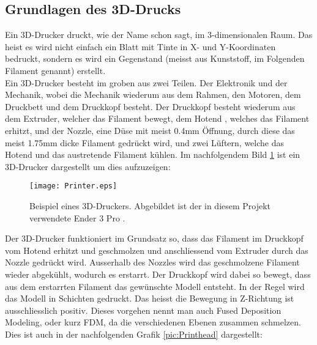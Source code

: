 \subsection{Grundlagen des 3D-Drucks}
\label{sec:Grundlagen3DDruck}

Ein 3D-Drucker druckt, wie der Name schon sagt, im 3-dimensionalen Raum. Das heist es wird nicht einfach ein Blatt mit Tinte in X- und Y-Koordinaten bedruckt, sondern es wird ein Gegenstand (meisst aus Kunststoff, im Folgenden Filament genannt) erstellt. \\

Ein 3D-Drucker besteht im groben aus zwei Teilen. Der Elektronik und der Mechanik, wobei die Mechanik wiederum aus dem Rahmen, den Motoren, dem Druckbett und dem Druckkopf besteht. Der Druckkopf besteht wiederum aus dem Extruder, welcher das Filament bewegt, dem Hotend , welches das Filament erhitzt, und der Nozzle, eine Düse mit meist 0.4mm Öffnung, durch diese das meist 1.75mm dicke Filament gedrückt wird, und zwei Lüftern, welche das Hotend  und das austretende Filament kühlen. Im nachfolgendem Bild \ref{pic:Printer} ist ein 3D-Drucker dargestellt um dies aufzuzeigen:

\begin{figure}[h]
	\centering
	\texttt{[image: Printer.eps]}
	\caption{Beispiel eines 3D-Druckers. Abgebildet ist der in diesem Projekt verwendete Ender 3 Pro \cite{Ender3Pro}.}
	\label{pic:Printer}
\end{figure}

Der 3D-Drucker funktioniert im Grundsatz so, dass das Filament im Druckkopf vom Hotend  erhitzt und geschmolzen und anschliessend vom Extruder durch das Nozzle gedrückt wird. Ausserhalb des Nozzles wird das geschmolzene Filament wieder abgekühlt, wodurch es erstarrt. Der Druckkopf wird dabei so bewegt, dass aus dem erstarrten Filament das gewünschte Modell entsteht. In der Regel wird das Modell in Schichten gedruckt. Das heisst die Bewegung in Z-Richtung ist ausschliesslich positiv. Dieses vorgehen nennt man auch Fused Deposition Modeling, oder kurz FDM, da die verschiedenen Ebenen zusammen schmelzen. Dies ist auch in der nachfolgenden Grafik \ref{pic:Printhead} dargestellt:\\


